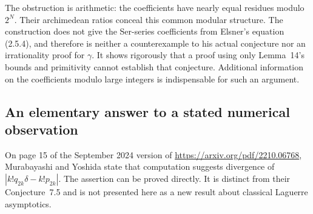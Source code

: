 \documentclass[11pt,a4paper]{article}
\theoremstyle{definition}
\theoremstyle{remark}
\numberwithin{equation}{section}
\begin{document}
The obstruction is arithmetic: the coefficients have nearly equal
residues modulo $2^N$.  Their archimedean ratios conceal this common
modular structure.  The construction does not give the Ser-series
coefficients from Elsner's equation (2.5.4), and therefore is neither
a counterexample to his actual conjecture nor an irrationality proof
for $\gamma$.  It shows rigorously that a proof using only
Lemma~14's bounds and primitivity cannot establish that conjecture.
Additional information on the coefficients modulo large integers
is indispensable for such an argument.

\subsection{An elementary answer to a stated numerical observation}

On page 15 of the September 2024 version of
\url{https://arxiv.org/pdf/2210.06768}, Murabayashi and Yoshida
state that computation suggests divergence of
$|k!q_{2k}\delta-k!p_{2k}|$.  The assertion can be proved directly.
It is distinct from their Conjecture~7.5 and is not presented here
as a new result about classical Laguerre asymptotics.
\end{document}
